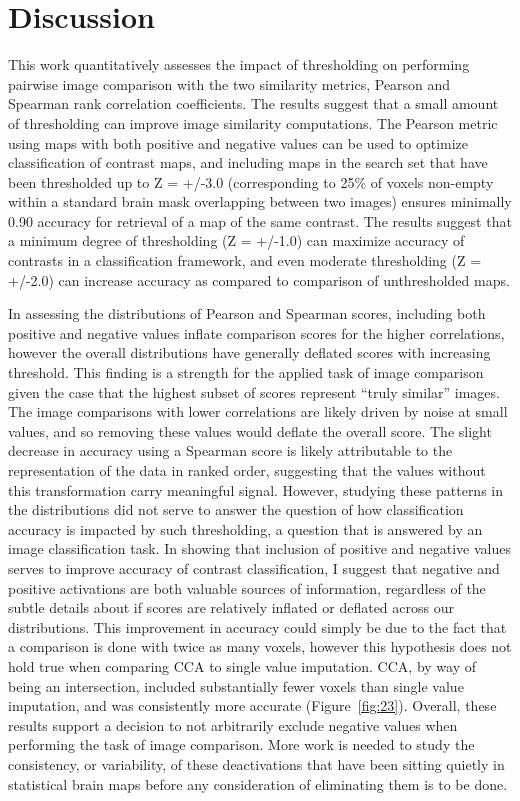 \documentclass{report}
\begin{document}
\section{Discussion}

This work quantitatively assesses the impact of thresholding on
performing pairwise image comparison with the two similarity metrics,
Pearson and Spearman rank correlation coefficients. The results suggest
that a small amount of thresholding can improve image similarity
computations. The Pearson metric using maps with both positive and
negative values can be used to optimize classification of contrast maps,
and including maps in the search set that have been thresholded up to Z
= +/-3.0 (corresponding to 25\% of voxels non-empty within a standard
brain mask overlapping between two images) ensures minimally 0.90
accuracy for retrieval of a map of the same contrast. The results
suggest that a minimum degree of thresholding (Z = +/-1.0) can maximize
accuracy of contrasts in a classification framework, and even moderate
thresholding (Z = +/-2.0) can increase accuracy as compared to comparison
of unthresholded maps.

In assessing the distributions of Pearson and Spearman scores, including
both positive and negative values inflate comparison scores for the
higher correlations, however the overall distributions have generally
deflated scores with increasing threshold. This finding is a strength
for the applied task of image comparison given the case that the highest
subset of scores represent ``truly similar'' images. The image comparisons with lower correlations are likely driven by noise at small
values, and so removing these values would deflate the overall score. The slight decrease in accuracy using a Spearman score is likely attributable to the representation of the data in ranked order, suggesting that the values without this transformation carry meaningful signal. However, studying these patterns in the distributions did not serve to answer the question of how classification accuracy is impacted by such thresholding, a question that is answered by an image classification task. In showing that inclusion of positive and negative values serves
to improve accuracy of contrast classification, I suggest that negative
and positive activations are both valuable sources of information,
regardless of the subtle details about if scores are relatively inflated
or deflated across our distributions. This improvement in accuracy could
simply be due to the fact that a comparison is done with twice as many
voxels, however this hypothesis does not hold true when comparing CCA to
single value imputation. CCA, by way of being an intersection, included
substantially fewer voxels than single value imputation, and was
consistently more accurate (Figure~\ref{fig:23}). Overall, these results support a decision to not arbitrarily exclude negative values when performing the
task of image comparison. More work is needed to study the consistency,
or variability, of these deactivations that have been sitting quietly in
statistical brain maps before any consideration of eliminating them is
to be done.
\end{document}
